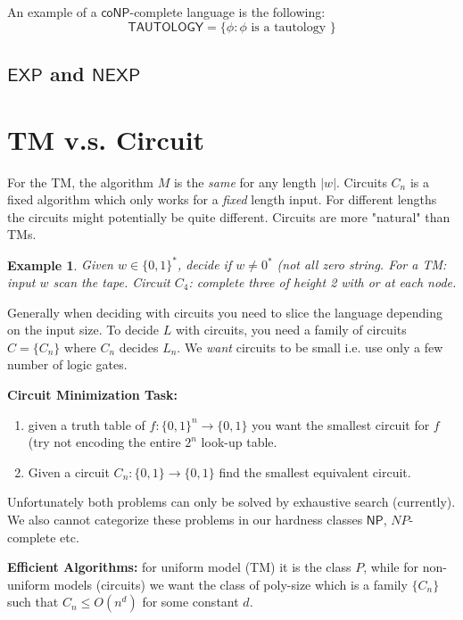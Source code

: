 \documentclass[twoside]{article}
\newtheorem{example}[theorem]{Example}
\def\NP{\mathsf{NP}}
\def\coNP{\mathsf{coNP}}
\def\EXP{\mathsf{EXP}}
\def\NEXP{\mathsf{NEXP}}
\begin{document}
An example of a $\coNP$-complete language is the following:
\[\mathsf{TAUTOLOGY} = \{\phi: \phi \mbox{ is a tautology }\}\]

\subsection{$\EXP$ and $\NEXP$}

\section{TM v.s. Circuit}
For the TM, the algorithm $M$ is the \emph{same} for any length $|w|$. Circuits $C_n$ is a fixed algorithm which only works for a \emph{fixed} length input. For different lengths the circuits might potentially be quite different. Circuits are more "natural" than TMs.

\begin{example}
Given $w \in \{ 0,1 \} ^*$, decide if $w \neq 0^*$ (not all zero string. For a TM: input $w$ scan the tape. Circuit $C_4$: complete three of height 2 with or at each node. 
\end{example}

Generally when deciding with circuits you need to slice the language depending on the input size. To decide $L$ with circuits, you need a family of circuits $C = \{C_n\}$ where $C_n$ decides $L_n$. We \emph{want} circuits to be small i.e. use only a few number of logic gates.

\textbf{Circuit Minimization Task:} 

\begin{enumerate}
\item given a truth table of $f: \{0,1\}^n \rightarrow \{0,1\}$ you want the smallest circuit for $f$ (try not encoding the entire $2^n$ look-up table.
\item Given a circuit $C_n: \{0,1\} \rightarrow \{0,1\}$ find the smallest equivalent circuit.
\end{enumerate}
Unfortunately both problems can only be solved by exhaustive search (currently). We also cannot categorize these problems in our hardness classes $\NP$, $NP$-complete etc.

\textbf{Efficient Algorithms:} for uniform model (TM) it is the class $P$, while for non-uniform models (circuits) we want the class of poly-size which is a family $\{C_n\}$ such that $C_n \leq O(n^d)$ for some constant $d$. 
\end{document}
